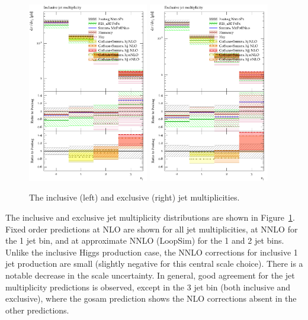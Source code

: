 \begin{figure}[t!]
  \centering
  \includegraphics[width=0.47\textwidth]{figures/hjetscomp_NJet_incl_30.pdf}
  \hfill
  \includegraphics[width=0.47\textwidth]{figures/hjetscomp_NJet_excl_30.pdf}
  \caption{
    The inclusive (left) and exclusive (right) jet multiplicities.
    \label{fig:higgscomp:results:inclobs:njets}
  }
\end{figure}


The inclusive and exclusive jet multiplicity distributions are shown
in Figure~\ref{fig:higgscomp:results:inclobs:njets}. Fixed order
predictions at NLO are shown for all jet multiplicities, at NNLO for
the 1 jet bin, and at approximate NNLO (LoopSim) for the 1 and 2 jet
bins. Unlike the inclusive Higgs production case, the NNLO corrections
for inclusive 1 jet production are small (slightly negative for this
central scale choice). There is a notable decrease in the scale
uncertainty. In general, good agreement for the jet multiplicity
predictions is observed, except in the 3 jet bin (both inclusive and
exclusive), where the gosam prediction shows the NLO corrections
absent in the other predictions.



